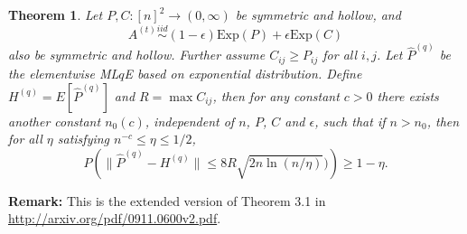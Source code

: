 \documentclass[a4paper]{article}
\newtheorem{theorem}[fact]{Theorem}
\begin{document}
\begin{theorem}
\label{thm:PqDiff}
Let $P, C :[n]^2 \rightarrow (0,\infty)$ be symmetric and hollow, and
\[
	A^{(t)} \stackrel{iid}{\sim} (1-\epsilon) \mathrm{Exp}(P) + \epsilon \mathrm{Exp}(C)
\]
also be symmetric and hollow. Further assume $C_{ij} \ge P_{ij}$ for all $i, j$.
Let $\hat{P}^{(q)}$ be the elementwise ML$q$E based on exponential distribution.
Define $H^{(q)} = E[\hat{P}^{(q)}]$ and $R=\max C_{ij}$,
then for any constant $c > 0$ there exists another constant $n_0(c)$, independent of $n$, $P$, $C$ and $\epsilon$, such that if $n > n_0$, then for all $\eta$ satisfying $n^{-c} \le \eta \le 1/2$,
\[
	P \left( \| \hat{P}^{(q)} - H^{(q)} \| \le 8 R \sqrt{2 n \ln(n/\eta)}) \right) \ge 1 - \eta.
\]
\end{theorem}
\textbf{Remark:} This is the extended version of Theorem 3.1 in \href{url}{http://arxiv.org/pdf/0911.0600v2.pdf}.
\end{document}
